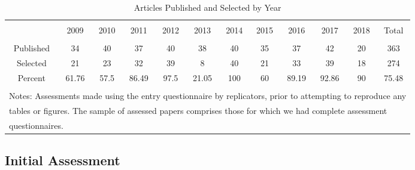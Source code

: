 \documentclass{cje} %
\theoremstyle{plain}%
\theoremstyle{definition}
\theoremstyle{remark}
\begin{document}
\begin{table} \centering 
  \caption{Articles Published and Selected by Year} 
  \label{tab:Selection} 
\tiny
\begin{tabular}{@{\extracolsep{0.4pt}} cccccccccccc} 
\\[-1.8ex]\hline 
\hline \\[-1.8ex] 
  & 2009 & 2010 & 2011 & 2012 & 2013 & 2014 & 2015 & 2016 & 2017 & 2018 & Total \\ 
\hline \\[-1.8ex] 
Published & 34 & 40 & 37 & 40 & 38 & 40 & 35 & 37 & 42 & 20 & 363 \\ 
Selected & 21 & 23 & 32 & 39 & 8 & 40 & 21 & 33 & 39 & 18 & 274 \\ 
Percent & 61.76 & 57.5 & 86.49 & 97.5 & 21.05 & 100 & 60 & 89.19 & 92.86 & 90 & 75.48 \\ 
\hline \\[-1.8ex] 
\multicolumn{12}{l}{Notes: Assessments made using the entry questionnaire by replicators, prior to attempting  to reproduce any} \\ 
\multicolumn{12}{l}{ tables or figures. The sample of assessed papers comprises those for which we had complete assessment  } \\ 
\multicolumn{12}{l}{questionnaires.} \\ 
\end{tabular} 
\end{table} 
\subsection{Initial Assessment}\label{sec:entry}
\end{document}
